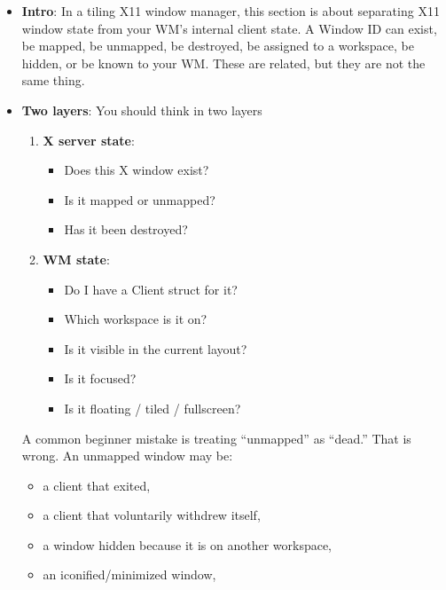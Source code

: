 \documentclass{report}
\begin{document}
    \pagebreak 
    \begin{itemize}
        \item \textbf{Intro}: In a tiling X11 window manager, this section is about separating X11 window state from your WM’s internal client state.
            \bigbreak \noindent 
            A Window ID can exist, be mapped, be unmapped, be destroyed, be assigned to a workspace, be hidden, or be known to your WM. These are related, but they are not the same thing.
        \item \textbf{Two layers}: You should think in two layers
            \begin{enumerate}
                \item \textbf{X server state}:
                    \begin{itemize}
                        \item Does this X window exist?
                        \item Is it mapped or unmapped?
                        \item Has it been destroyed?
                    \end{itemize}
                \item \textbf{WM state}: 
                    \begin{itemize}
                        \item Do I have a Client struct for it?
                        \item Which workspace is it on?
                        \item Is it visible in the current layout?
                        \item Is it focused?
                        \item Is it floating / tiled / fullscreen?
                    \end{itemize}
            \end{enumerate}
            A common beginner mistake is treating “unmapped” as “dead.” That is wrong.
            \bigbreak \noindent 
            An unmapped window may be:
            \begin{itemize}
                \item a client that exited,
                \item a client that voluntarily withdrew itself,
                \item a window hidden because it is on another workspace,
                \item an iconified/minimized window,

\end{itemize}
\end{itemize}
\end{document}
